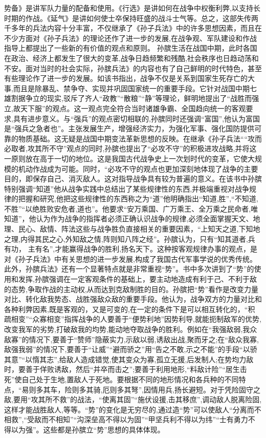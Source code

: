 \documentclass[12pt,UTF8]{ctexbook}
\begin{document}
势备》是讲军队力量的配备和使用。《行选》是讲如何在战争中权衡利弊,以支持长时期的作战。《延气》是讲如何使士卒保持旺盛的战斗士气等。总之，这部失传两千多年的兵法内容十分丰富，不仅继承了《孙子兵法》中的许多思想因素，而且在不少方面对《孙子兵法》的理论还作了进一步的发展,在战争观、军队建设和作战指导上都提出了一些新的有价值的观点和原则。
孙膑生活在战国中期，此时各国在政治、经济上都发生了很大的变革,战争日趋频繁和残酷,社会秩序也日趋动荡和不安。面对当时的社会实际，孙膑兵法》的内容也有了自己鲜明的时代特色，甚至有些理论作了进一步的发展。如该书指出，战争不仅是关系到国家生死存亡的大事,而且是除暴乱、禁争夺、实现并巩固国家统一的重要手段。它针对战国中期七雄割据争立的现实,驳斥了齐人“政教”“散粮”“静”等理论，鲜明地提出了“战胜而强立,故天下服”的观点。这一观点完全符合当时诸雄争霸、全国趋向统一的客观要求,具有进步意义。与“强兵”的观点密切相联的,孙膑同时还强调“富国”,他认为富国是“强兵之急者也”。主张发展生产，增强经济实力，为强化军事、强化国防提供可靠的物质基础。这无疑是战国中期变法革新思想的反映。在继承《孙子兵法““攻而必取者,攻其所不守”观点的同时,孙膑也提出了“必攻不守”的积极进攻战略,并将这一原则放在高于一切的地位。这是我国古代战争史上一次划时代的变革，它使大规模的机动作战成为可能。同时，“必攻不守的观点也更加深刻地体现了战争的主要目的，即保存自己、消灭敌人。这对指导战争具有较为普遍的意义。在该书中孙膑特别强调“知道”他从战争实践中总结出了某些规律性的东西,并极端重视对战争规律的把握和研究,他把这些规律性的东西称之为“道”他明确指出“知道,胜”,“不知道,不胜”“以绝胜败安危者,道也”。他要求“安万乘国、广万乘王、全万乘之民命者,唯知道”，他认为作为战争的指挥者必须正确认识战争的规律,必须全面掌握天文、地理、民心、敌情、阵法这些与战争胜负直接相关的重要因素，“上知天之道,下知地之理,内得其民之心,外知敌之情,阵则知八阵之经”。孙膑认为，只有“知其道者,兵有功，
主有名”,才能赢得战争的胜利,扬名天下。这种按客观规律办事的观点，是对《孙子兵法》中有关思想的进一步发展,构成了我国古代军事学说的优秀传统。
此外，孙膑兵法》还有一个显著特点就是非常重视“势”。书中多次讲到了“势”的使用和发挥,孙膑强调在一定客观条件的基础上，要主动地造成有利于己、不利于敌的态势,争取作战的主动权,从而达到克敌制胜的目的。孙膑把“势”看作是改变力量对比、转化敌我势态、战胜强敌众敌的重要手段。他认为，战争双方的力量对比和各种利弊因素,既是客观的，又是可变的,在一定的条件下是可以相互转化的，“积疏相变”“众寡相变”指挥战争的人要善于“便势利地”因势利导,就能扼制敌军的优势,改变我军的劣势,打破敌我的均势,能动地夺取战争的胜利。例如在“我强敌弱,我众敌寡”的情况下,要善于“赞师”隐蔽实力,示敌以弱,诱敌出战,聚而牙之;在“敌众我寡,敌强我弱”的情况下,要善于“让威”“避而骄之”用“告之不敢,示之不能”的手段“以骄其意”“以惰其志”,给敌人造成错觉,使其变众为寡,孤立无援,后发制人;在势均力敌时，要善于佯败诱敌，然后“并卒而击之”;要善于利用地形,“料敌计险”“居生击死”使自己处于生地,置敌人于死地。要根据不同的地形情况和各兵种的不同特点，“易则多其车，险则多其骑,厄则多其弩”,因情用兵,扬长避短。对于凭险固守之敌,要用“攻其所不救”的战法，“使离其固”“施伏设援,击其移庶”,调动敌人脱离险固,这样才能战胜敌人,等等。“势”的变化是无穷尽的,通过造“势”可以使敌人“分离而不相救”,“受敌而不相知”“沟深垒高不得以为固”“甲坚兵利不得以为纬”“士有勇力不得以为强”。这些都是孙膑立“势”思想的具体体现。
\end{document}
